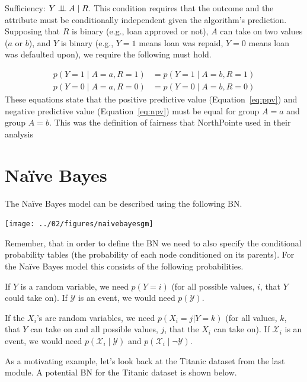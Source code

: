 \documentclass{tufte-handout}
\begin{document}
\item Sufficiency: $Y \perp\!\!\!\perp A\mid R$.  This condition requires that the outcome and the attribute must be conditionally independent given the algorithm's prediction.   Supposing that $R$ is binary (e.g., loan approved or not), $A$ can take on two values ($a$ or $b$), and $Y$ is binary (e.g., $Y=1$ means loan was repaid, $Y=0$ means loan was defaulted upon), we require the following must hold.

\begin{align}
p(Y=1 \mid A=a, R=1) &= p(Y=1 \mid A=b, R=1) \label{eq:ppv} \\
p(Y=0 \mid A=a, R=0) &= p(Y=0 \mid A=b, R=0) \label{eq:npv}
\end{align}
These equations state that the positive predictive value (Equation~\ref{eq:ppv}) and negative predictive value (Equation~\ref{eq:npv}) must be equal for group $A=a$ and group $A=b$.  This was the definition of fairness that NorthPointe used in their analysis
\ei

\section{Na\"ive Bayes}

The Na\"ive Bayes model can be described using the following BN.

\begin{center}
\texttt{[image: ../02/figures/naivebayesgm]}
\end{center}

Remember, that in order to define the BN we need to also specify the conditional probability tables (the probability of each node conditioned on its parents).  For the Na\"ive Bayes model this consists of the following probabilities.

\bi
\item If $Y$ is a random variable, we need $p(Y=i)$ (for all possible values, $i$, that $Y$ could take on).  If $\mathcal{Y}$ is an event, we would need $p(\mathcal{Y})$.
\item If the $X_i$'s are random variables, we need $p(X_i=j | Y=k)$ (for all values, $k$, that $Y$ can take on and all possible values, $j$, that the $X_i$ can take on).  If $\mathcal{X}_i$ is an event, we would need $p(\mathcal{X}_i \mid \mathcal{Y})$ and $p(\mathcal{X}_i \mid \neg \mathcal{Y})$.
\ei

As a motivating example, let's look back at the Titanic dataset from the last module.  A potential BN for the Titanic dataset is shown below.
\end{document}
